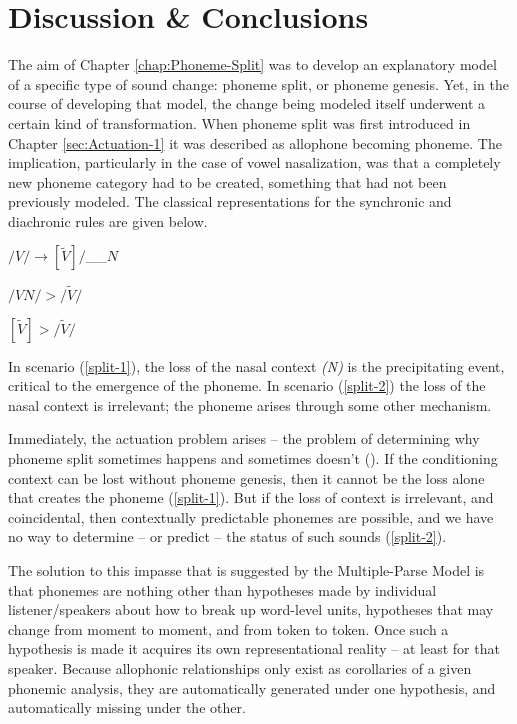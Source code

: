 \chapter{\label{subsec:Summary-=000026-Conclusions}Discussion \& Conclusions}

The aim of Chapter \ref{chap:Phoneme-Split} was to develop an explanatory
model of a specific type of sound change: phoneme split, or phoneme
genesis. Yet, in the course of developing that model, the change being
modeled itself underwent a certain kind of transformation. When phoneme
split was first introduced in Chapter \ref{sec:Actuation-1} it was
described as allophone becoming phoneme. The implication, particularly
in the case of vowel nasalization, was that a completely new phoneme
category had to be created, something that had not been previously
modeled. The classical representations for the synchronic and diachronic
rules are given below.
\begin{covexample}
\label{allophonic rule}$/V/\rightarrow[\tilde{V}]/$\_\_$N$
\end{covexample}
\begin{covsubexamples}
\item \label{split-1}$/VN/>/\tilde{V}/$
\item \label{split-2}$[\tilde{V}]>/\tilde{V}/$
\end{covsubexamples}
In scenario (\ref{split-1}), the loss of the nasal context \emph{(N)}
is the precipitating event, critical to the emergence of the phoneme.
In scenario (\ref{split-2}) the loss of the nasal context is irrelevant;
the phoneme arises through some other mechanism.

Immediately, the actuation problem arises – the problem of determining
why phoneme split sometimes happens and sometimes doesn't (\citealt{Labov1968}).
If the conditioning context can be lost without phoneme genesis, then
it cannot be the loss alone that creates the phoneme (\ref{split-1}).
But if the loss of context is irrelevant, and coincidental, then contextually
predictable phonemes are possible, and we have no way to determine
– or predict – the status of such sounds (\ref{split-2}).

The solution to this impasse that is suggested by the Multiple-Parse
Model is that phonemes are nothing other than hypotheses made by individual
listener/speakers about how to break up word-level units, hypotheses
that may change from moment to moment, and from token to token. Once
such a hypothesis is made it acquires its own representational reality
– at least for that speaker. Because allophonic relationships only
exist as corollaries of a given phonemic analysis, they are automatically
generated under one hypothesis, and automatically missing under the
other. 

